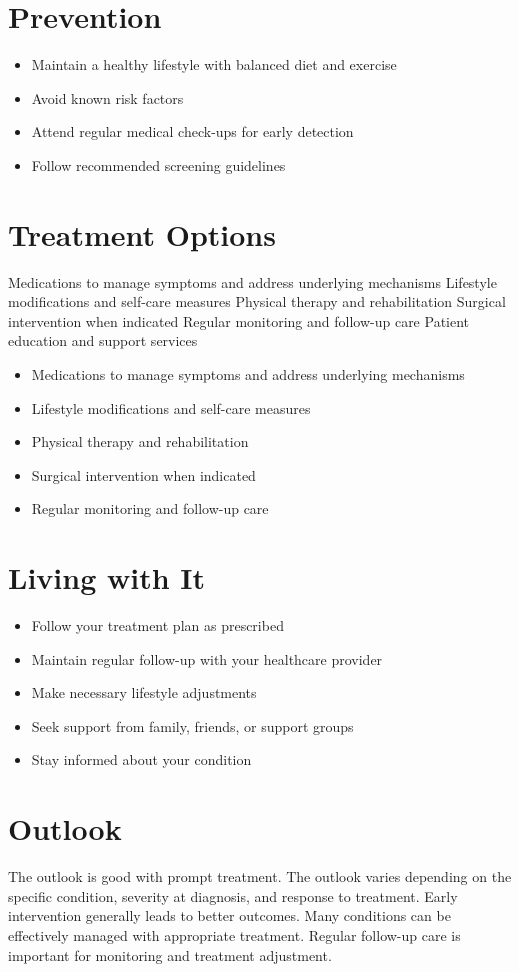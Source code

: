 \section{Prevention}
\begin{itemize}[noitemsep]
  \item Maintain a healthy lifestyle with balanced diet and exercise
  \item Avoid known risk factors
  \item Attend regular medical check-ups for early detection
  \item Follow recommended screening guidelines
\end{itemize}
\section{Treatment Options}
Medications to manage symptoms and address underlying mechanisms Lifestyle modifications and self-care measures Physical therapy and rehabilitation Surgical intervention when indicated Regular monitoring and follow-up care Patient education and support services

\begin{itemize}[noitemsep]
  \item Medications to manage symptoms and address underlying mechanisms
  \item Lifestyle modifications and self-care measures
  \item Physical therapy and rehabilitation
  \item Surgical intervention when indicated
  \item Regular monitoring and follow-up care
\end{itemize}
\section{Living with It}
\begin{itemize}[noitemsep]
  \item Follow your treatment plan as prescribed
  \item Maintain regular follow-up with your healthcare provider
  \item Make necessary lifestyle adjustments
  \item Seek support from family, friends, or support groups
  \item Stay informed about your condition
\end{itemize}
\section{Outlook}
The outlook is good with prompt treatment. The outlook varies depending on the specific condition, severity at diagnosis, and response to treatment. Early intervention generally leads to better outcomes. Many conditions can be effectively managed with appropriate treatment. Regular follow-up care is important for monitoring and treatment adjustment.
